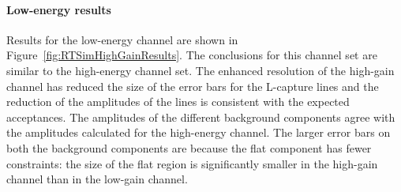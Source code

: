 					\paragraph{Low-energy results}

Results for the low-energy channel are shown in Figure~\ref{fig:RTSimHighGainResults}. The conclusions for this channel set are similar to the high-energy channel set.  The enhanced resolution of the high-gain channel has reduced the size of the error bars for the L-capture lines and the reduction of the amplitudes of the lines is consistent with the expected acceptances.  The amplitudes of the different background components agree with the amplitudes calculated for the high-energy channel.  The larger error bars on both the background components are because the flat component has fewer constraints: the size of the flat region is significantly smaller in the high-gain channel than in the low-gain channel.  


						\begin{sidewaysfigure}
							\centering
							\caption[Behavior of fit components after cuts for high-gain BeGe channel]
							{Behavior of fit components after cuts for high-gain channel.}
							\label{fig:RTSimHighGainResults}
						\end{sidewaysfigure}
						
